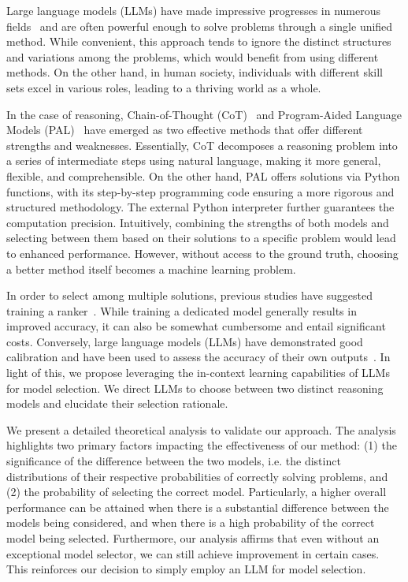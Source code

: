 \documentclass[11pt]{article}
\begin{document}
Large language models (LLMs) have made impressive progresses in numerous fields~\citep{Devlin2019BERTPO, Brown2020LanguageMA, OpenAI2023GPT4TR, Chowdhery2022PaLMSL, Bubeck2023SparksOA, Wei2022EmergentAO} and are often powerful enough to solve problems through a single unified method. While convenient, this approach tends to ignore the distinct structures and variations among the problems, which would benefit from using different methods. On the other hand, in human society, individuals with different skill sets excel in various roles, leading to a thriving world as a whole. 

In the case of reasoning, Chain-of-Thought (CoT)~\cite{Wei2022ChainOT} and Program-Aided Language Models (PAL)~\citep{Gao2022PALPL, Chen2022ProgramOT} have emerged as two effective methods that offer different strengths and weaknesses. Essentially, CoT decomposes a reasoning problem into a series of intermediate steps using natural language, making it more general, flexible, and comprehensible. On the other hand, PAL offers solutions via Python functions, with its step-by-step programming code ensuring a more rigorous and structured methodology. The external Python interpreter further guarantees the computation precision. Intuitively, combining the strengths of both models and selecting between them based on their solutions to a specific problem would lead to enhanced performance. However, without access to the ground truth, choosing a better method itself becomes a machine learning problem.

In order to select among multiple solutions, previous studies have suggested training a ranker~\citep{Uesato2022SolvingMW}. While training a dedicated model generally results in improved accuracy, it can also be somewhat cumbersome and entail significant costs. Conversely, large language models (LLMs) have demonstrated good calibration and have been used to assess the accuracy of their own outputs~\citep{Guo2017OnCO, Shinn2023ReflexionAA, Xie2023DecompositionER}. In light of this, we propose leveraging the in-context learning capabilities of LLMs for model selection. We direct LLMs to choose between two distinct reasoning models and elucidate their selection rationale.

We present a detailed theoretical analysis to validate our approach. The analysis highlights two primary factors impacting the effectiveness of our method: (1) the significance of the difference between the two models, i.e. the distinct distributions of their respective probabilities of correctly solving problems, and (2) the probability of selecting the correct model. Particularly, a higher overall performance can be attained when there is a substantial difference between the models being considered, and when there is a high probability of the correct model being selected. Furthermore, our analysis affirms that even without an exceptional model selector, we can still achieve improvement in certain cases. This reinforces our decision to simply employ an LLM for model selection. 
\end{document}
